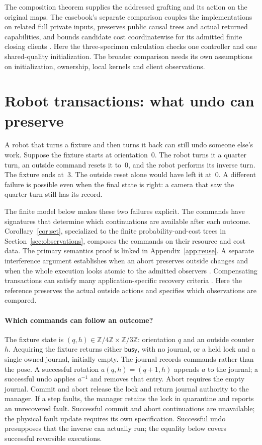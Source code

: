\documentclass[11pt]{article}
\numberwithin{equation}{section}
\theoremstyle{definition}\newtheorem{definition}[theorem]{Definition}
\begin{document}
The composition theorem supplies the addressed grafting and its action
on the original maps. The casebook's separate comparison couples the
implementations on related full private inputs, preserves public causal
trees and actual returned capabilities, and bounds candidate cost
coordinatewise for its admitted finite closing clients
\cite[Sec.~3]{Casebook}. Here the three-specimen calculation checks
one controller and one shared-quality initialization. The broader
comparison needs its own assumptions on initialization, ownership,
local kernels and client observations.

\section{Robot transactions: what undo can preserve}\label{app:robot}

A robot that turns a fixture and then turns it back can still undo
someone else's work. Suppose the fixture starts at orientation~\(0\).
The robot turns it a quarter turn, an outside command resets it to~\(0\),
and the robot performs its inverse turn. The fixture ends at~\(3\).
The outside reset alone would have left it at~\(0\). A different failure
is possible even when the final state is right: a camera that saw the
quarter turn still has its record.

The finite model below makes these two failures explicit. The
commands have signatures that determine which continuations are
available after each outcome. Corollary~\ref{cor:set}, specialized to
the finite probability-and-cost trees in Section~\ref{sec:observations},
composes the commands on their resource and cost data. The primary
semantics proof is linked in Appendix~\ref{app:reuse}. A separate
interference argument establishes when an abort
preserves outside changes and when the whole execution looks atomic
to the admitted observers \cite{RobotTransactions}. Compensating
transactions can satisfy many application-specific recovery criteria
\cite{KorthLevySilberschatz}. Here the reference preserves the actual
outside actions and specifies which observations are compared.

\paragraph{Which commands can follow an outcome?}
The fixture state is \((q,h)\in\mathbb Z/4\mathbb Z\times\mathbb Z/3\mathbb Z\):
orientation \(q\) and an outside counter \(h\). Acquiring the fixture
returns either \(\mathsf{busy}\), with no journal, or a held lock and
a single owned journal, initially empty. The journal records commands
rather than the pose. A successful rotation \(a(q,h)=(q+1,h)\) appends
\(a\) to the journal; a successful undo applies \(a^{-1}\) and removes
that entry. Abort requires the empty journal. Commit and abort release
the lock and return journal authority to the manager. If a step
faults, the manager retains the lock in quarantine and reports an
unrecovered fault. Successful commit and abort continuations are
unavailable; the physical fault update requires its own specification. Successful undo
presupposes that the inverse can actually run; the equality below
covers successful reversible executions.
\end{document}
